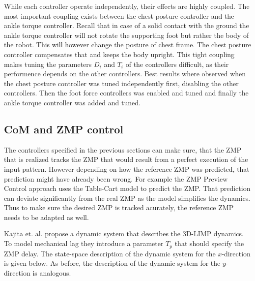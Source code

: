 \documentclass[english,ngerman]{KITreprt}
\begin{document}
While each controller operate independently, their effects are highly
coupled. The most important coupling exists between the chest posture
controller and the ankle torque controller. Recall that in case of a
solid contact with the ground the ankle torque controller will not
rotate the supporting foot but rather the body of the robot. This will
however change the posture of chest frame. The chest posture controller
compensates that and keeps the body upright. This tight coupling makes
tuning the parameters $D_i$ and $T_i$ of the controllers difficult, as
their performence depends on the other controllers. Best results where
observed when the chest posture controller was tuned independently
first, disabling the other controllers. Then the foot force controllers
was enabled and tuned and finally the ankle torque controller was added
and tuned.

\subsection{CoM and ZMP control}\label{com-and-zmp-control}

The controllers specified in the previous sections can make sure, that
the ZMP that is realized tracks the ZMP that would result from a perfect
execution of the input pattern. However depending on how the reference
ZMP was predicted, that prediction might have already been wrong. For
example the ZMP Preview Control approach uses the Table-Cart model to
predict the ZMP. That prediction can deviate significantly from the real
ZMP as the model simplifies the dynamics. Thus to make sure the desired
ZMP is tracked acurately, the reference ZMP needs to be adapted as well.

Kajita et. al. propose a dynamic system that describes the 3D-LIMP
dynamics. To model mechanical lag they introduce a parameter $T_p$ that
should specify the ZMP delay. The state-space description of the dynamic
system for the $x$-direction is given below. As before, the description
of the dynamic system for the $y$-direction is analogous.
\end{document}
